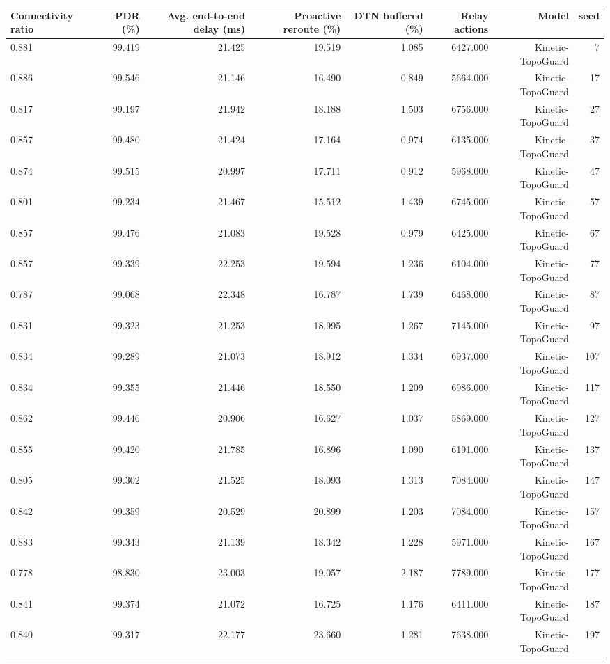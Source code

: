 \begin{tabular}{lrrrrrrr}
\toprule
Connectivity ratio & PDR (\%) & Avg. end-to-end delay (ms) & Proactive reroute (\%) & DTN buffered (\%) & Relay actions & Model & seed \\
\midrule
0.881 & 99.419 & 21.425 & 19.519 & 1.085 & 6427.000 & Kinetic-TopoGuard & 7 \\
0.886 & 99.546 & 21.146 & 16.490 & 0.849 & 5664.000 & Kinetic-TopoGuard & 17 \\
0.817 & 99.197 & 21.942 & 18.188 & 1.503 & 6756.000 & Kinetic-TopoGuard & 27 \\
0.857 & 99.480 & 21.424 & 17.164 & 0.974 & 6135.000 & Kinetic-TopoGuard & 37 \\
0.874 & 99.515 & 20.997 & 17.711 & 0.912 & 5968.000 & Kinetic-TopoGuard & 47 \\
0.801 & 99.234 & 21.467 & 15.512 & 1.439 & 6745.000 & Kinetic-TopoGuard & 57 \\
0.857 & 99.476 & 21.083 & 19.528 & 0.979 & 6425.000 & Kinetic-TopoGuard & 67 \\
0.857 & 99.339 & 22.253 & 19.594 & 1.236 & 6104.000 & Kinetic-TopoGuard & 77 \\
0.787 & 99.068 & 22.348 & 16.787 & 1.739 & 6468.000 & Kinetic-TopoGuard & 87 \\
0.831 & 99.323 & 21.253 & 18.995 & 1.267 & 7145.000 & Kinetic-TopoGuard & 97 \\
0.834 & 99.289 & 21.073 & 18.912 & 1.334 & 6937.000 & Kinetic-TopoGuard & 107 \\
0.834 & 99.355 & 21.446 & 18.550 & 1.209 & 6986.000 & Kinetic-TopoGuard & 117 \\
0.862 & 99.446 & 20.906 & 16.627 & 1.037 & 5869.000 & Kinetic-TopoGuard & 127 \\
0.855 & 99.420 & 21.785 & 16.896 & 1.090 & 6191.000 & Kinetic-TopoGuard & 137 \\
0.805 & 99.302 & 21.525 & 18.093 & 1.313 & 7084.000 & Kinetic-TopoGuard & 147 \\
0.842 & 99.359 & 20.529 & 20.899 & 1.203 & 7084.000 & Kinetic-TopoGuard & 157 \\
0.883 & 99.343 & 21.139 & 18.342 & 1.228 & 5971.000 & Kinetic-TopoGuard & 167 \\
0.778 & 98.830 & 23.003 & 19.057 & 2.187 & 7789.000 & Kinetic-TopoGuard & 177 \\
0.841 & 99.374 & 21.072 & 16.725 & 1.176 & 6411.000 & Kinetic-TopoGuard & 187 \\
0.840 & 99.317 & 22.177 & 23.660 & 1.281 & 7638.000 & Kinetic-TopoGuard & 197 \\
\bottomrule
\end{tabular}
